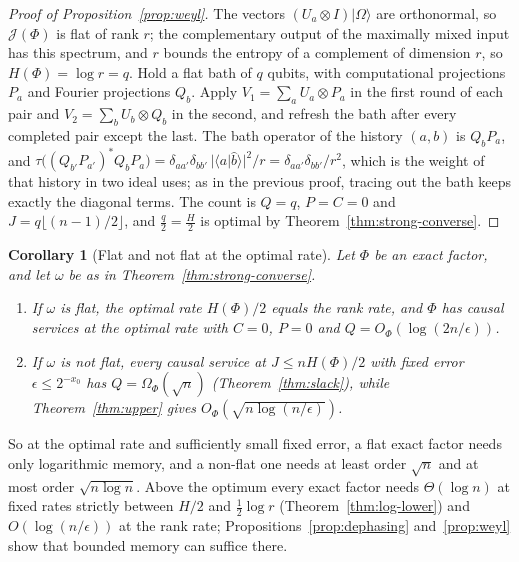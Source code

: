 \documentclass[11pt,a4paper]{article}
\theoremstyle{plain}
\newtheorem{corollary}[theorem]{Corollary}
\theoremstyle{definition}
\theoremstyle{remark}
\begin{document}
\begin{proof}[Proof of Proposition~\ref{prop:weyl}]
The vectors $(U_a\otimes I)|\Omega\rangle$ are orthonormal, so $\mathcal J(\Phi)$ is flat of rank $r$; the complementary output of the
maximally mixed input has this spectrum, and $r$ bounds the entropy of a complement of dimension $r$, so $H(\Phi)=\log r=q$. Hold
a flat bath of $q$ qubits, with computational projections $P_a$ and Fourier projections $Q_b$. Apply
$V_1=\sum_aU_a\otimes P_a$ in the first round of each pair and $V_2=\sum_bU_b\otimes Q_b$ in the second, and refresh the bath after
every completed pair except the last. The bath operator of the history $(a,b)$ is $Q_bP_a$, and
$\tau\big((Q_{b'}P_{a'})^*Q_bP_a\big)=\delta_{aa'}\delta_{bb'}\,|\langle a|\hat b\rangle|^2/r=\delta_{aa'}\delta_{bb'}/r^2$, which is the
weight of that history in two ideal uses; as in the previous proof, tracing out the bath keeps exactly the diagonal terms. The
count is $Q=q$, $P=C=0$ and $J=q\lfloor(n-1)/2\rfloor$, and $\frac q2=\frac H2$ is optimal by Theorem~\ref{thm:strong-converse}.
\end{proof}


\begin{corollary}[Flat and not flat at the optimal rate]\label{cor:flat-split}
Let $\Phi$ be an exact factor, and let $\omega$ be as in Theorem~\ref{thm:strong-converse}.
\begin{enumerate}[label=(\alph*)]
\item If $\omega$ is flat, the optimal rate $H(\Phi)/2$ equals the rank rate, and $\Phi$ has causal services at the optimal rate with $C=0$,
$P=0$ and $Q=O_\Phi(\log(2n/\epsilon))$.
\item If $\omega$ is not flat, every causal service at $J\le nH(\Phi)/2$ with fixed error $\epsilon\le2^{-x_0}$ has $Q=\Omega_\Phi(\sqrt n)$
(Theorem~\ref{thm:slack}), while Theorem~\ref{thm:upper} gives $O_\Phi(\sqrt{n\log(n/\epsilon)})$.
\end{enumerate}
\end{corollary}

So at the optimal rate and sufficiently small fixed error, a flat exact factor needs only logarithmic memory, and a non-flat one needs at least order $\sqrt n$ and at most order
$\sqrt{n\log n}$. Above the optimum
every exact factor needs $\Theta(\log n)$ at fixed rates strictly between $H/2$ and $\frac12\log r$ (Theorem~\ref{thm:log-lower}) and $O(\log(n/\epsilon))$ at
the rank rate; Propositions~\ref{prop:dephasing} and~\ref{prop:weyl} show that bounded memory can suffice there.
\end{document}
